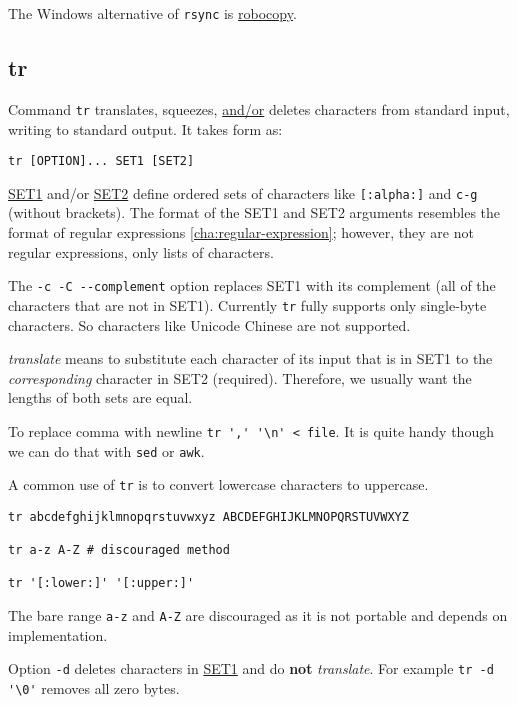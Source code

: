 The Windows alternative of \verb|rsync| is
\href{https://www.zhstar.win/2015/04/30/robocopy/}{robocopy}.

\subsection{tr}
\label{sec:bash-tr}

Command \lstinline|tr| translates, squeezes, \uline{and/or}
deletes characters from standard input, writing to standard
output. It takes form as:

\begin{lstlisting}
tr [OPTION]... SET1 [SET2]
\end{lstlisting}

\uline{SET1} and/or \uline{SET2} define ordered sets of characters
like \lstinline|[:alpha:]| and \lstinline|c-g| (without
brackets). The format of the SET1 and SET2 arguments resembles the
format of regular expressions \ref{cha:regular-expression};
however, they are not regular expressions, only lists of
characters.

The \lstinline|-c -C --complement| option replaces SET1 with its
complement (all of the characters that are not in SET1). Currently
\lstinline|tr| fully supports only single-byte characters. So
characters like Unicode Chinese are not supported.

\textit{translate} means to substitute each character of its input
that is in SET1 to the \textit{corresponding} character in SET2
(required). Therefore, we usually want the lengths of both sets
are equal.

To replace comma with newline \lstinline|tr ',' '\n' < file|. It
is quite handy though we can do that with \lstinline|sed| or
\lstinline|awk|.

A common use of \lstinline|tr| is to convert lowercase characters to
uppercase.

\begin{lstlisting}
tr abcdefghijklmnopqrstuvwxyz ABCDEFGHIJKLMNOPQRSTUVWXYZ

tr a-z A-Z # discouraged method

tr '[:lower:]' '[:upper:]'
\end{lstlisting}

The bare range \verb|a-z| and \verb|A-Z| are discouraged as it is
not portable and depends on implementation.

Option \lstinline|-d| deletes characters in \uline{SET1} and do
\textbf{not} \textit{translate}. For example
\lstinline|tr -d '\0'| removes all zero bytes.

